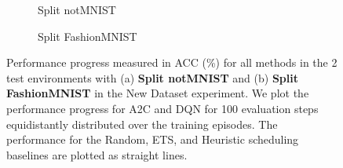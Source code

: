 \begin{figure}[t]
	\centering
	\setlength{\figwidth}{0.26\textwidth}
	\setlength{\figheight}{.14\textheight}
	\begin{subfigure}[t]{0.48\textwidth}
		\centering
		
		\vspace{-4mm} %
		\caption{Split notMNIST}
		\label{fig:rewards_notmnist_2envs}
	\end{subfigure}%
	\begin{subfigure}[t]{0.48\textwidth}
		\centering
		
		\caption{Split FashionMNIST}
		\label{fig:rewards_fashionmnist_2envs}
	\end{subfigure}
	\vspace{-1mm}
	\caption{Performance progress measured in ACC (\%) for all methods in the 2 test environments with (a) {\bf Split notMNIST} and (b) {\bf Split FashionMNIST} in the New Dataset experiment. We plot the performance progress for A2C and DQN for 100 evaluation steps equidistantly distributed over the training episodes. The performance for the Random, ETS, and Heuristic scheduling baselines are plotted as straight lines.  }
	\label{fig:rewards_new_dataset_2envs}
	\vspace{-2mm}
\end{figure}

\vspace{-3mm}
